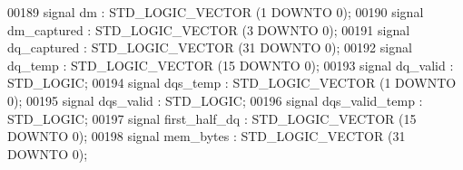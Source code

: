 \begin{DoxyCode}
00189                 \textcolor{keywordflow}{signal} \textcolor{vhdlchar}{dm} \textcolor{vhdlchar}{:}  \textcolor{comment}{STD\_LOGIC\_VECTOR} \textcolor{vhdlchar}{(}\textcolor{vhdllogic}{}\textcolor{vhdllogic}{1} \textcolor{keywordflow}{DOWNTO} \textcolor{vhdllogic}{}\textcolor{vhdllogic}{0}\textcolor{vhdlchar}{)};
00190                 \textcolor{keywordflow}{signal} \textcolor{vhdlchar}{dm_captured} \textcolor{vhdlchar}{:}  \textcolor{comment}{STD\_LOGIC\_VECTOR} \textcolor{vhdlchar}{(}\textcolor{vhdllogic}{}\textcolor{vhdllogic}{3} \textcolor{keywordflow}{DOWNTO} \textcolor{vhdllogic}{}\textcolor{vhdllogic}{0}\textcolor{vhdlchar}{)};
00191                 \textcolor{keywordflow}{signal} \textcolor{vhdlchar}{dq_captured} \textcolor{vhdlchar}{:}  \textcolor{comment}{STD\_LOGIC\_VECTOR} \textcolor{vhdlchar}{(}\textcolor{vhdllogic}{}\textcolor{vhdllogic}{31} \textcolor{keywordflow}{DOWNTO} \textcolor{vhdllogic}{}\textcolor{vhdllogic}{0}\textcolor{vhdlchar}{)};
00192                 \textcolor{keywordflow}{signal} \textcolor{vhdlchar}{dq_temp} \textcolor{vhdlchar}{:}  \textcolor{comment}{STD\_LOGIC\_VECTOR} \textcolor{vhdlchar}{(}\textcolor{vhdllogic}{}\textcolor{vhdllogic}{15} \textcolor{keywordflow}{DOWNTO} \textcolor{vhdllogic}{}\textcolor{vhdllogic}{0}\textcolor{vhdlchar}{)};
00193                 \textcolor{keywordflow}{signal} \textcolor{vhdlchar}{dq_valid} \textcolor{vhdlchar}{:}  \textcolor{comment}{STD\_LOGIC};
00194                 \textcolor{keywordflow}{signal} \textcolor{vhdlchar}{dqs_temp} \textcolor{vhdlchar}{:}  \textcolor{comment}{STD\_LOGIC\_VECTOR} \textcolor{vhdlchar}{(}\textcolor{vhdllogic}{}\textcolor{vhdllogic}{1} \textcolor{keywordflow}{DOWNTO} \textcolor{vhdllogic}{}\textcolor{vhdllogic}{0}\textcolor{vhdlchar}{)};
00195                 \textcolor{keywordflow}{signal} \textcolor{vhdlchar}{dqs_valid} \textcolor{vhdlchar}{:}  \textcolor{comment}{STD\_LOGIC};
00196                 \textcolor{keywordflow}{signal} \textcolor{vhdlchar}{dqs_valid_temp} \textcolor{vhdlchar}{:}  \textcolor{comment}{STD\_LOGIC};
00197                 \textcolor{keywordflow}{signal} \textcolor{vhdlchar}{first_half_dq} \textcolor{vhdlchar}{:}  \textcolor{comment}{STD\_LOGIC\_VECTOR} \textcolor{vhdlchar}{(}\textcolor{vhdllogic}{}\textcolor{vhdllogic}{15} \textcolor{keywordflow}{DOWNTO} \textcolor{vhdllogic}{}\textcolor{vhdllogic}{0}\textcolor{vhdlchar}{)};
00198                 \textcolor{keywordflow}{signal} \textcolor{vhdlchar}{mem_bytes} \textcolor{vhdlchar}{:}  \textcolor{comment}{STD\_LOGIC\_VECTOR} \textcolor{vhdlchar}{(}\textcolor{vhdllogic}{}\textcolor{vhdllogic}{31} \textcolor{keywordflow}{DOWNTO} \textcolor{vhdllogic}{}\textcolor{vhdllogic}{0}\textcolor{vhdlchar}{)};

\end{DoxyCode}
